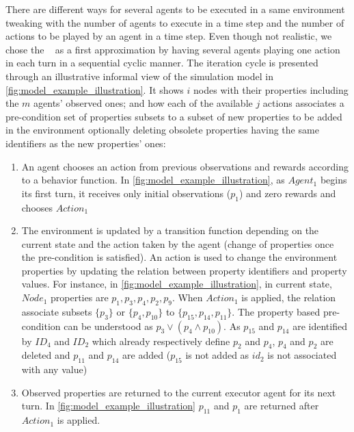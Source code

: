 There are different ways for several agents to be executed in a same environment tweaking with the number of agents to execute in a time step and the number of actions to be played by an agent in a time step. Even though not realistic, we chose the ~\cite{jk2020} as a first approximation by having several agents playing one action in each turn in a sequential cyclic manner. The iteration cycle is presented through an illustrative informal view of the simulation model in \autoref{fig:model_example_illustration}. It shows $i$ nodes with their properties including the $m$ agents' observed ones; and how each of the available $j$ actions associates a pre-condition set of properties subsets to a subset of new properties to be added in the environment optionally deleting obsolete properties having the same identifiers as the new properties' ones: \begin{enumerate}[label=\arabic*),itemjoin={;\quad}]     
    \item An agent chooses an action from previous observations and rewards according to a behavior function. In \autoref{fig:model_example_illustration}, as $Agent_1$ begins its first turn, it receives only initial observations ($p_{1}$) and zero rewards and chooses $Action_1$
    
    \item The environment is updated by a transition function depending on the current state and the action taken by the agent (change of properties once the pre-condition is satisfied). An action is used to change the environment properties by updating the relation between property identifiers and property values.
    For instance, in \autoref{fig:model_example_illustration}, in current state, $Node_1$ properties are $p_1,p_3,p_4,p_2,p_9$. When $Action_1$ is applied, the relation associate subsets $\{p_3\}$ or $\{p_4, \allowbreak p_{10}\}$ to $\{p_{15}, \allowbreak p_{14}, \allowbreak p_{11}\}$. The property based pre-condition can be understood as $p_3 \lor (p_4 \land p_{10})$. As $p_{15}$ and $p_{14}$ are identified by $ID_4$ and $ID_2$ which already respectively define $p_{2}$ and $p_{4}$, $p_{4}$ and $p_{2}$ are deleted and $p_{11}$ and $p_{14}$ are added ($p_{15}$ is not added as $id_2$ is not associated with any value)
    
    \item Observed properties are returned to the current executor agent for its next turn. In \autoref{fig:model_example_illustration} $p_{11}$ and $p_1$ are returned after $Action_1$ is applied.

\end{enumerate}

